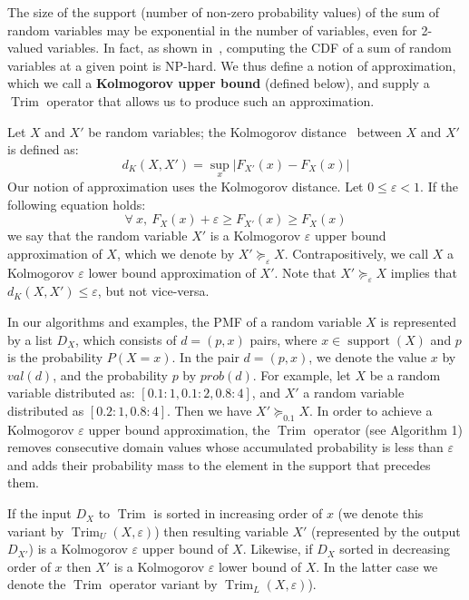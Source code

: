 \documentclass[review]{elsarticle}
\DeclareMathOperator{\support}{support}
\DeclareMathOperator{\Trim}{Trim}
\begin{document}
The size of the support (number of non-zero probability values) of the sum of random variables
may be exponential in the number of variables, even for 2-valued variables.
In fact, as shown in~\cite{mohring2001scheduling}, computing the CDF of a sum of random variables at a given point is NP-hard.
We thus define a notion of approximation, 
which we call a {\bf Kolmogorov upper bound} (defined below), and 
supply a $\Trim$ operator that allows us to produce such an approximation.

Let $X$ and $X'$ be random variables; 
the Kolmogorov distance~\cite{lilliefors1967kolmogorov} between $X$ and $X'$ is defined as:
\[
d_K(X,X') = \sup_{x} |F_{X'}(x)-F_X(x)|
\]
Our notion of approximation uses the Kolmogorov distance. Let $0\leq\varepsilon<1$. %
If the following equation holds:
\[
\forall ~ x, ~ F_X(x)+\varepsilon \geq F_{X'}(x) \geq F_X(x)
\]
we say that the random variable $X'$ is a Kolmogorov $\varepsilon$ upper bound approximation of $X$,
which we denote by $X' \succeq_\varepsilon X$. Contrapositively, we call $X$ a  Kolmogorov $\varepsilon$ lower
bound approximation of $X'$. Note that $X' \succeq_\varepsilon X$ implies that $d_K(X,X') \leq \varepsilon$,
but not vice-versa.

In our algorithms and examples,
the PMF of a random variable $X$ is represented by a list $D_X$, 
which consists of $d=(p, x)$ pairs, where $x\in \support(X)$
and $p$ is the probability $P(X=x)$. In the pair $d=(p, x)$, we denote the value $x$
by $val(d)$, and the probability $p$ by $prob(d)$.
For example, let $X$ be a random variable distributed as: $[0.1:1, 0.1:2, 0.8:4]$, and $X'$ a random variable distributed as $[0.2:1, 0.8:4]$. Then we have $X' \succeq_{0.1} X$. In order to achieve a Kolmogorov $\varepsilon$ upper bound approximation,
the $\Trim$ operator (see Algorithm 1) removes consecutive domain values whose accumulated probability is
less than $\varepsilon$ and adds 
their probability mass to the element in the support that precedes them.

If the input $D_X$ to $\Trim$ is sorted in increasing order of $x$ (we denote this variant by $\Trim_U(X, \varepsilon)$)
then resulting variable $X'$ (represented by the output $D_{X'}$) 
is a Kolmogorov $\varepsilon$ upper bound of $X$.
Likewise, if $D_X$ sorted in decreasing order of $x$
then $X'$ is a Kolmogorov $\varepsilon$ 
lower bound of $X$. In the latter case we denote the $\Trim$ operator variant by $\Trim_L(X, \varepsilon)$).
\end{document}
